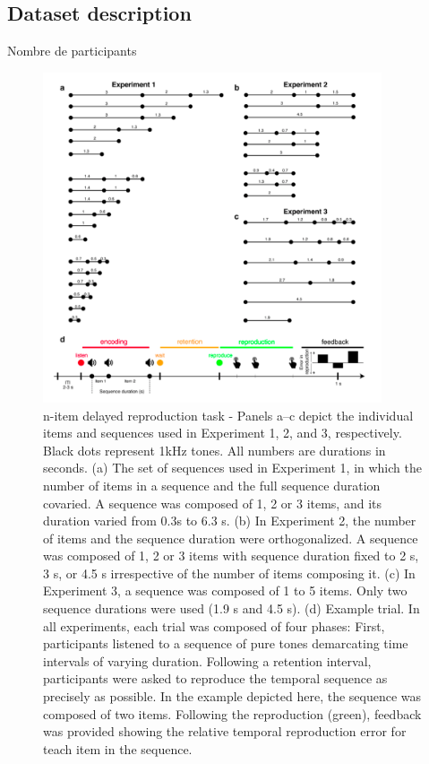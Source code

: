 \subsection{Dataset description}


Nombre de participants


\begin{figure}[ht]
    \centering
    \includegraphics[width=10cm]{images_report/n-item delayed reproduction task.png}
    \caption[n-item delayed reproduction task]%
    {n-item delayed reproduction task - Panels a–c depict the individual items and sequences used in Experiment 1, 2, and 3, respectively. Black dots represent 1kHz tones. All numbers are durations in seconds. (a) The set of sequences used in Experiment 1, in which the number of items in a sequence and the full sequence duration covaried. A sequence was composed of 1, 2 or 3 items, and its duration varied from 0.3s to 6.3 s. (b) In Experiment 2, the number of items and the sequence duration were orthogonalized. A sequence was composed of 1, 2 or 3 items with sequence duration fixed to 2 s, 3 s, or 4.5 s irrespective of the number of items composing it. (c) In Experiment 3, a sequence was composed of 1 to 5 items. Only two sequence durations were used (1.9 s and 4.5 s). (d) Example trial. In all experiments, each trial was composed of four phases: First, participants listened to a sequence of pure tones demarcating time intervals of varying duration. Following a retention interval, participants were asked to reproduce the temporal sequence as precisely as possible. In the example depicted here, the sequence was composed of two items. Following the reproduction (green), feedback was provided showing the relative temporal reproduction error for teach item in the sequence.}

    \label{paradigm}
\end{figure}

